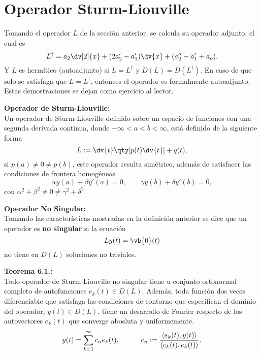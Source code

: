 	

\section*{Operador Sturm-Liouville}
Tomando el operador $L$ de la sección anterior, se calcula su operador adjunto, el cual es
\begin{equation}	
	L^\dagger = a_2 \dv[2]{x} + (2a_2 ' - a_1 ') \dv{x} + (a_2 '' - a_1 ' + a_o). \label{Ladjoint}
\end{equation}
Y $L$ es hermítico (autoadjunto) si $L = L^\dagger$ y $D(L) = D(L^\dagger)$. En caso de que solo se satisfaga que $L = L^\dagger$, entonces el operador es formalmente autoadjunto. Estas demostraciones se dejan como ejercicio al lector.


\begin{mdframed}[style=warning]
	{\Large \textbf{Operador de Sturm-Liouville:}} \\
	Un operador de Sturm-Liouville definido sobre un espacio de funciones con una segunda derivada continua, donde $-\infty < a < b < \infty$, está definido de la siguiente forma
	\begin{equation}
		L := \dv{t} \qty[p(t) \dv{t}] + q(t), \label{opsturm}
	\end{equation}
	si $p(a) \neq 0 \neq p(b)$, este operador resulta simétrico, además de satisfacer las condiciones de frontera homogéneas
		$$ \alpha y(a) + \beta y'(a) = 0, \qquad \gamma y(b) + \delta y'(b) = 0, $$
	con $\alpha ^2 + \beta ^2 \neq 0 \neq \gamma ^2 + \delta ^2$.
\end{mdframed}



\begin{mdframed}[style=warning]
	{\Large \textbf{Operador No Singular:}} \\
	Tomando las características mostradas en la definición anterior se dice que un operador es \textbf{no singular} si la ecuación
		$$ Ly(t) = \vb{0} (t) $$
	no tiene en $D(L)$ soluciones no triviales.
\end{mdframed}



\begin{mdframed}[style=warning]
	{\Large \textbf{Teorema 6.1.:}} \\
	Todo operador de Sturm-Liouville no singular tiene u conjunto ortonormal completo de autofunciones $e_k (t) \in D(L)$. Además, toda función dos veces diferenciable que satisfaga las condiciones de contorno que especifican el dominio del operador, $y(t) \in D(L)$, tiene un desarrollo de Fourier respecto de los autovectores $e_k (t)$ que converge abosluta y uniformemente.
		$$ y(t) = \sum _{k = 1} ^{\infty} c_n e_k (t), \qquad \quad c_n := \frac{\langle e_k (t) , y(t) \rangle}{\langle e_k (t) , e_k (t) \rangle}. $$
\end{mdframed}



